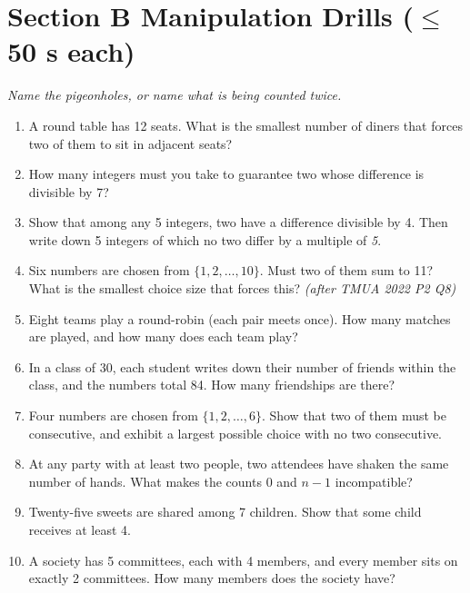 \documentclass[11pt,a4paper]{article}
\begin{document}
\section*{Section B \quad Manipulation Drills \hfill{\normalfont\small($\leq$50 s each)}}

\noindent\textit{Name the pigeonholes, or name what is being counted twice.}

\begin{enumerate}

\item A round table has 12 seats. What is the smallest number of diners that forces two of them to sit in adjacent seats?

\item How many integers must you take to guarantee two whose difference is divisible by 7?

\item Show that among any 5 integers, two have a difference divisible by 4. Then write down 5 integers of which no two differ by a multiple of \emph{5}.

\item Six numbers are chosen from $\{1,2,\ldots,10\}$. Must two of them sum to 11? What is the smallest choice size that forces this? \textit{\small(after TMUA 2022 P2 Q8)}

\item Eight teams play a round-robin (each pair meets once). How many matches are played, and how many does each team play?

\item In a class of 30, each student writes down their number of friends within the class, and the numbers total 84. How many friendships are there?

\item Four numbers are chosen from $\{1,2,\ldots,6\}$. Show that two of them must be consecutive, and exhibit a largest possible choice with no two consecutive.

\item At any party with at least two people, two attendees have shaken the same number of hands. What makes the counts $0$ and $n-1$ incompatible?

\item Twenty-five sweets are shared among 7 children. Show that some child receives at least 4.

\item A society has 5 committees, each with 4 members, and every member sits on exactly 2 committees. How many members does the society have?

\end{enumerate}
\end{document}
